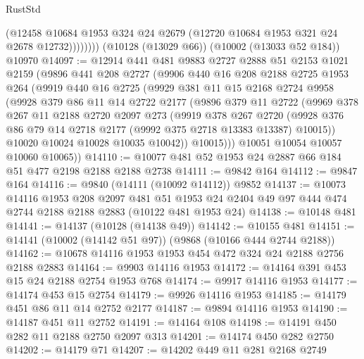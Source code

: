 \begin{lexlean}{RustStd}
\begin{coremodule}
                (@12458
                  @10684
                  @1953
                  @324
                  @24
                  @2679
                  (@12720 @10684 @1953 @321 @24 @2678 @12732))))))))
    (@10128 (@13029 @66))
    (@10002 (@13033 @52 @184))
    @10970
@14097 := @12914
    @441
    @481
    @9883
    @2727
    @2888
    @51
    @2153
    @1021
    @2159
    (@9896
      @441
      @208
      @2727
      (@9906
        @440
        @16
        @208
        @2188
        @2725
        @1953
        @264
        (@9919
          @440
          @16
          @2725
          (@9929
            @381
            @11
            @15
            @2168
            @2724
            @9958
            (@9928
              @379
              @86
              @11
              @14
              @2722
              @2177
              (@9896
                @379
                @11
                @2722
                (@9969
                  @378
                  @267
                  @11
                  @2188
                  @2720
                  @2097
                  @273
                  (@9919
                    @378
                    @267
                    @2720
                    (@9928 @376 @86 @79 @14 @2718 @2177 (@9992 @375 @2718 @13383 @13387) @10015))
                  @10020
                  @10024
                  @10028
                  @10035
                  @10042))
              @10015)))
        @10051
        @10054
        @10057
        @10060
        @10065))
@14110 := @10077 @481 @52 @1953 @24 @2887 @66 @184 @51 @477 @2198 @2188 @2188 @2738
@14111 := @9842 @164
@14112 := @9847 @164
@14116 := @9840 (@14111 (@10092 @14112)) @9852
@14137 := @10073
    @14116
    @1953
    @208
    @2097
    @481
    @51
    @1953
    @24
    @2404
    @49
    @97
    @444
    @474
    @2744
    @2188
    @2188
    @2883
    (@10122 @481 @1953 @24)
@14138 := @10148 @481
@14141 := @14137 (@10128 (@14138 @49))
@14142 := @10155 @481
@14151 := @14141 (@10002 (@14142 @51 @97)) (@9868 (@10166 @444 @2744 @2188))
@14162 := @10678 @14116 @1953 @1953 @454 @472 @324 @24 @2188 @2756 @2188 @2883
@14164 := @9903 @14116 @1953
@14172 := @14164 @391 @453 @15 @24 @2188 @2754 @1953 @768
@14174 := @9917 @14116 @1953
@14177 := @14174 @453 @15 @2754
@14179 := @9926 @14116 @1953
@14185 := @14179 @451 @86 @11 @14 @2752 @2177
@14187 := @9894 @14116 @1953
@14190 := @14187 @451 @11 @2752
@14191 := @14164 @108
@14198 := @14191 @450 @282 @11 @2188 @2750 @2097 @313
@14201 := @14174 @450 @282 @2750
@14202 := @14179 @71
@14207 := @14202 @449 @11 @281 @2168 @2749

\end{coremodule}
\end{lexlean}
